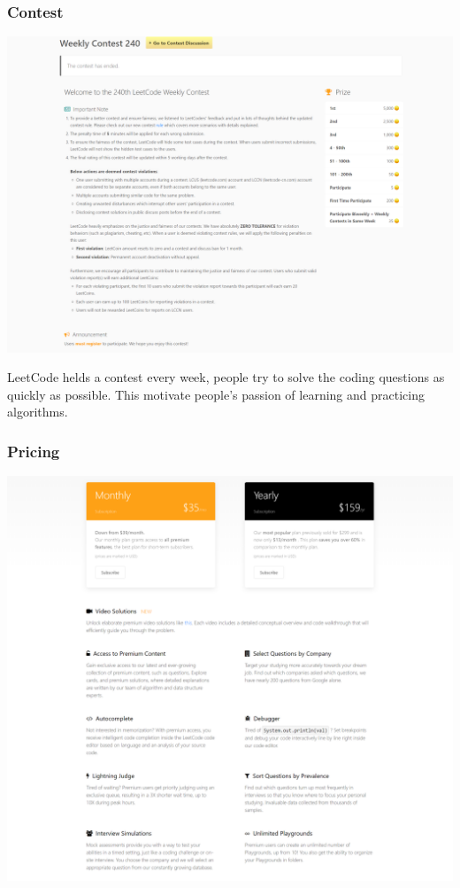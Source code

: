 \documentclass[a4paper]{report}
\begin{document}
\subsubsection{Contest}

\includegraphics[width=\linewidth]{Contest-LeetCode}

LeetCode helds a contest every week, people try to solve the coding questions as quickly as possible. This motivate people's passion of learning and practicing algorithms.

\subsubsection{Pricing}

\includegraphics[width=\linewidth]{LeetCode-Premium}
\end{document}
